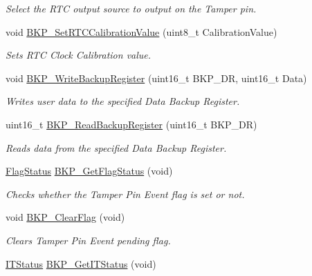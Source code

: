 \begin{DoxyCompactItemize}
\begin{DoxyCompactList}\small\item\em Select the R\+TC output source to output on the Tamper pin. \end{DoxyCompactList}\item 
void \mbox{\hyperlink{group___b_k_p___private___functions_gad34db08a944450d2e7d56d0fd8db2bca}{B\+K\+P\+\_\+\+Set\+R\+T\+C\+Calibration\+Value}} (uint8\+\_\+t Calibration\+Value)
\begin{DoxyCompactList}\small\item\em Sets R\+TC Clock Calibration value. \end{DoxyCompactList}\item 
void \mbox{\hyperlink{group___b_k_p___private___functions_ga18d220387db651b3cb71fad5c092e041}{B\+K\+P\+\_\+\+Write\+Backup\+Register}} (uint16\+\_\+t B\+K\+P\+\_\+\+DR, uint16\+\_\+t Data)
\begin{DoxyCompactList}\small\item\em Writes user data to the specified Data Backup Register. \end{DoxyCompactList}\item 
uint16\+\_\+t \mbox{\hyperlink{group___b_k_p___private___functions_ga359d8fbc945e0f4e34fedbe037d842c8}{B\+K\+P\+\_\+\+Read\+Backup\+Register}} (uint16\+\_\+t B\+K\+P\+\_\+\+DR)
\begin{DoxyCompactList}\small\item\em Reads data from the specified Data Backup Register. \end{DoxyCompactList}\item 
\mbox{\hyperlink{group___exported__types_ga89136caac2e14c55151f527ac02daaff}{Flag\+Status}} \mbox{\hyperlink{group___b_k_p___private___functions_gacc9aedde760383f0bd146f0d77a547db}{B\+K\+P\+\_\+\+Get\+Flag\+Status}} (void)
\begin{DoxyCompactList}\small\item\em Checks whether the Tamper Pin Event flag is set or not. \end{DoxyCompactList}\item 
void \mbox{\hyperlink{group___b_k_p___private___functions_ga3f3aea5b0a3d8d5d79b0b506928351ea}{B\+K\+P\+\_\+\+Clear\+Flag}} (void)
\begin{DoxyCompactList}\small\item\em Clears Tamper Pin Event pending flag. \end{DoxyCompactList}\item 
\mbox{\hyperlink{group___exported__types_gaacbd7ed539db0aacd973a0f6eca34074}{I\+T\+Status}} \mbox{\hyperlink{group___b_k_p___private___functions_ga99566c9f1f17f499020606cb63511494}{B\+K\+P\+\_\+\+Get\+I\+T\+Status}} (void)

\end{DoxyCompactItemize}
